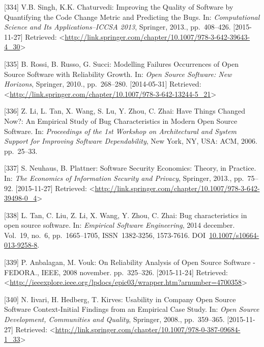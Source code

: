 \documentclass[12pt,magyar,a4paper,oneside]{scrreprt}
\begin{document}
\leavevmode\hypertarget{ref-singh_improving_2013}{}%
{[}334{]} V.B. Singh, K.K. Chaturvedi: Improving the Quality of Software
by Quantifying the Code Change Metric and Predicting the Bugs. In:
\emph{Computational Science and Its Applications--ICCSA 2013}, Springer,
2013., pp.~408--426. {[}2015-11-27{]} Retrieved:
\textless{}\url{http://link.springer.com/chapter/10.1007/978-3-642-39643-4_30}\textgreater{}

\leavevmode\hypertarget{ref-rossi_modelling_2010}{}%
{[}335{]} B. Rossi, B. Russo, G. Succi: Modelling Failures Occurrences
of Open Source Software with Reliability Growth. In: \emph{Open Source
Software: New Horizons}, Springer, 2010., pp.~268--280. {[}2014-05-31{]}
Retrieved:
\textless{}\url{http://link.springer.com/chapter/10.1007/978-3-642-13244-5_21}\textgreater{}

\leavevmode\hypertarget{ref-li_have_2006}{}%
{[}336{]} Z. Li, L. Tan, X. Wang, S. Lu, Y. Zhou, C. Zhai: Have Things
Changed Now?: An Empirical Study of Bug Characteristics in Modern Open
Source Software. In: \emph{Proceedings of the 1st Workshop on
Architectural and System Support for Improving Software Dependability},
New York, NY, USA: ACM, 2006. pp.~25--33.

\leavevmode\hypertarget{ref-neuhaus_software_2013}{}%
{[}337{]} S. Neuhaus, B. Plattner: Software Security Economics: Theory,
in Practice. In: \emph{The Economics of Information Security and
Privacy}, Springer, 2013., pp.~75--92. {[}2015-11-27{]} Retrieved:
\textless{}\url{http://link.springer.com/chapter/10.1007/978-3-642-39498-0_4}\textgreater{}

\leavevmode\hypertarget{ref-tan_bug_2014}{}%
{[}338{]} L. Tan, C. Liu, Z. Li, X. Wang, Y. Zhou, C. Zhai: Bug
characteristics in open source software. In: \emph{Empirical Software
Engineering}, 2014 december. Vol.~19, no.~6, pp.~1665--1705,
ISSN~1382-3256, 1573-7616.
DOI~\href{https://doi.org/10.1007/s10664-013-9258-8}{10.1007/s10664-013-9258-8}.

\leavevmode\hypertarget{ref-anbalagan_reliability_2008}{}%
{[}339{]} P. Anbalagan, M. Vouk: On Reliability Analysis of Open Source
Software - FEDORA., IEEE, 2008 november. pp.~325--326. {[}2015-11-24{]}
Retrieved:
\textless{}\url{http://ieeexplore.ieee.org/lpdocs/epic03/wrapper.htm?arnumber=4700358}\textgreater{}

\leavevmode\hypertarget{ref-iivari_usability_2008}{}%
{[}340{]} N. Iivari, H. Hedberg, T. Kirves: Usability in Company Open
Source Software Context-Initial Findings from an Empirical Case Study.
In: \emph{Open Source Development, Communities and Quality}, Springer,
2008., pp.~359--365. {[}2015-11-27{]} Retrieved:
\textless{}\url{http://link.springer.com/chapter/10.1007/978-0-387-09684-1_33}\textgreater{}
\end{document}
